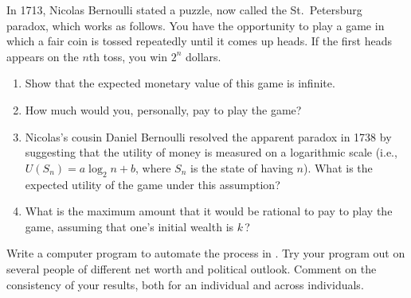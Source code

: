 \begin{exercise}
In 1713, Nicolas Bernoulli stated a puzzle, now called the
St.~Petersburg paradox, which
works as follows.  You have the opportunity to play a game in which a
fair coin is tossed repeatedly until it comes up
heads.  If the first heads appears on the \(n\)th toss, you win \(2^n\)
dollars.
\begin{enumerate}
\item Show that the expected monetary value of this game is infinite.
\item How much would you, personally, pay to play the game?
\item Nicolas's cousin Daniel Bernoulli resolved the apparent paradox in 1738 by suggesting
that the utility of money
is measured on a logarithmic scale (i.e.,
\(U(S_{n}) = a\log_2 n +b\), where \(S_n\) is the state of having {\DollarSign}\(n\)).
What is the expected utility of the game under this assumption?
\item What is the maximum amount that it would be rational to pay 
to play the game, assuming that 
one's initial wealth is {\DollarSign}\(k\,\)?
\end{enumerate}
\end{exercise} 

\begin{exercise} \prgex
Write a computer program to automate the process in
. Try your program out on several people of
different net worth and political outlook. Comment on the consistency of your
results, both for an individual and across individuals.
\end{exercise} 

